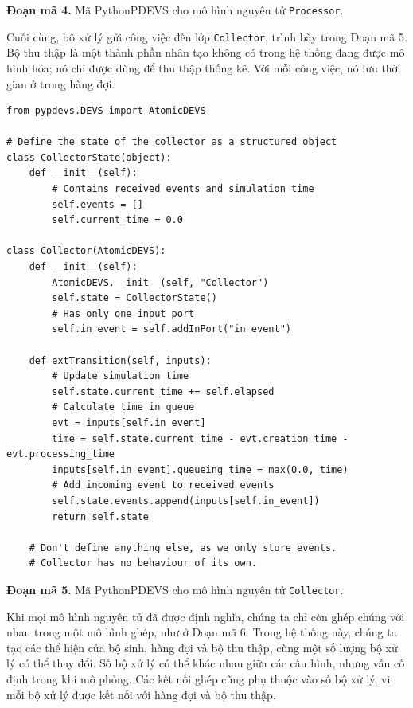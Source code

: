 \noindent\textbf{Đoạn mã 4.} Mã PythonPDEVS cho mô hình nguyên tử \texttt{Processor}.

Cuối cùng, bộ xử lý gửi công việc đến lớp \texttt{Collector}, trình bày trong Đoạn mã 5. Bộ thu thập là một thành phần nhân tạo không có trong hệ thống đang được mô hình hóa; nó chỉ được dùng để thu thập thống kê. Với mỗi công việc, nó lưu thời gian ở trong hàng đợi.

\begin{verbatim}
from pypdevs.DEVS import AtomicDEVS

# Define the state of the collector as a structured object
class CollectorState(object):
    def __init__(self):
        # Contains received events and simulation time
        self.events = []
        self.current_time = 0.0

class Collector(AtomicDEVS):
    def __init__(self):
        AtomicDEVS.__init__(self, "Collector")
        self.state = CollectorState()
        # Has only one input port
        self.in_event = self.addInPort("in_event")

    def extTransition(self, inputs):
        # Update simulation time
        self.state.current_time += self.elapsed
        # Calculate time in queue
        evt = inputs[self.in_event]
        time = self.state.current_time - evt.creation_time - evt.processing_time
        inputs[self.in_event].queueing_time = max(0.0, time)
        # Add incoming event to received events
        self.state.events.append(inputs[self.in_event])
        return self.state

    # Don't define anything else, as we only store events.
    # Collector has no behaviour of its own.
\end{verbatim}
\noindent\textbf{Đoạn mã 5.} Mã PythonPDEVS cho mô hình nguyên tử \texttt{Collector}.

Khi mọi mô hình nguyên tử đã được định nghĩa, chúng ta chỉ còn ghép chúng với nhau trong một mô hình ghép, như ở Đoạn mã 6. Trong hệ thống này, chúng ta tạo các thể hiện của bộ sinh, hàng đợi và bộ thu thập, cùng một số lượng bộ xử lý có thể thay đổi. Số bộ xử lý có thể khác nhau giữa các cấu hình, nhưng vẫn cố định trong khi mô phỏng. Các kết nối ghép cũng phụ thuộc vào số bộ xử lý, vì mỗi bộ xử lý được kết nối với hàng đợi và bộ thu thập.

